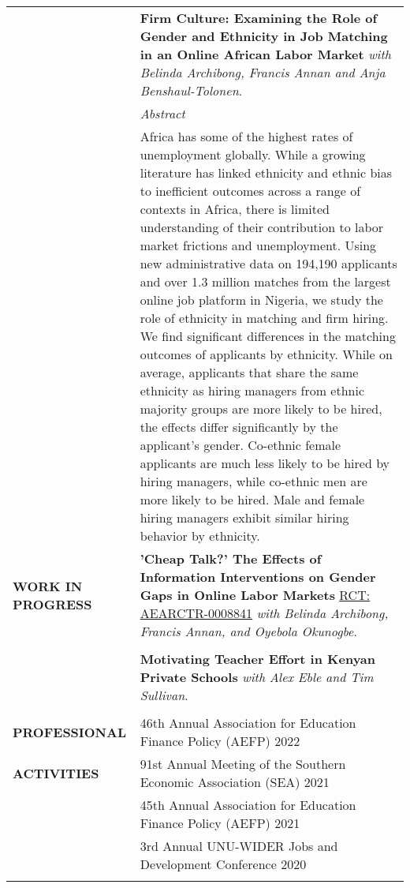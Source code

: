 \documentclass[letterpaper, 11pt]{article}
\begin{document}
\begin{longtable}{p{1.2in}p{4.8in}}
& \textbf{\color{Blue}Firm Culture: Examining the Role of Gender and Ethnicity in Job Matching in an Online African Labor Market}  \textit{with Belinda Archibong, Francis Annan and Anja Benshaul-Tolonen}. \\
& \textit{Abstract} \\
& Africa has some of the highest rates of unemployment globally. While a growing literature has linked ethnicity and ethnic bias to inefficient outcomes across a range of contexts in Africa, there is limited understanding of their contribution to labor market frictions and unemployment. Using new administrative data on 194,190 applicants and over 1.3 million matches from the largest online job platform in Nigeria, we study the role of ethnicity in matching and firm hiring. We find significant differences in the matching outcomes of applicants by ethnicity. While on average, applicants that share the same ethnicity as hiring managers from ethnic majority groups are more likely to be hired, the effects differ significantly by the applicant’s gender. Co-ethnic female applicants are much less likely to be hired by hiring managers, while co-ethnic men are more likely to be hired. Male and female hiring managers exhibit similar hiring behavior by ethnicity.
& \\

\nohyphens{{{\textbf{WORK IN PROGRESS}}}} 
& \textbf{\color{Blue}'Cheap Talk?’ The Effects of Information Interventions on Gender Gaps in Online Labor Markets} \href{https://www.socialscienceregistry.org/trials/8841}{RCT: AEARCTR-0008841} \textit{with Belinda Archibong, Francis Annan, and Oyebola Okunogbe}. \\ \\
& \textbf{\color{Blue}Motivating Teacher Effort in Kenyan Private Schools} \textit{with Alex Eble and Tim Sullivan}. \\
& \\




{\textbf{PROFESSIONAL}}
& 46th Annual Association for Education Finance Policy (AEFP) \hfill 2022 \\
{\textbf{ACTIVITIES}}
& 91st Annual Meeting of the Southern Economic Association (SEA) \hfill 2021 \\
& 45th Annual Association for Education Finance Policy (AEFP) \hfill 2021 \\
& 3rd Annual UNU-WIDER Jobs and Development Conference \hfill 2020 \\ \\


\end{longtable}
\end{document}
